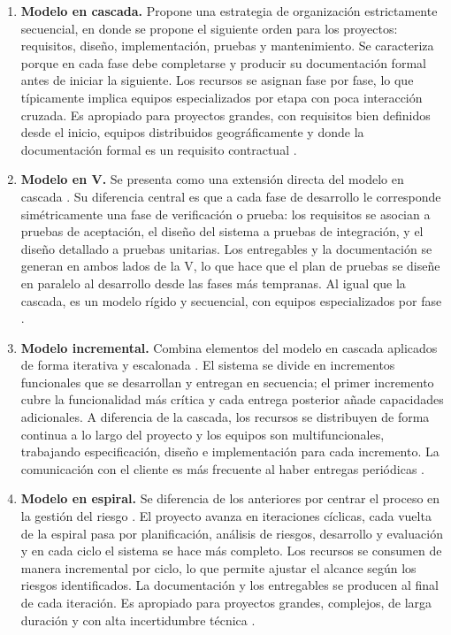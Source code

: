 \documentclass{article}
\begin{document}
\begin{enumerate}
    \item \textbf{Modelo en cascada.} Propone una estrategia de organización estrictamente secuencial, en donde se propone el siguiente orden para los proyectos: requisitos, diseño, implementación, pruebas y mantenimiento. Se caracteriza porque en cada fase debe completarse y producir su documentación formal antes de iniciar la siguiente. Los recursos se asignan fase por fase, lo que típicamente implica equipos especializados por etapa con poca interacción cruzada. Es apropiado para proyectos grandes, con requisitos bien definidos desde el inicio, equipos distribuidos geográficamente y donde la documentación formal es un requisito contractual \cite{pressman2015}.
    \item \textbf{Modelo en V.} Se presenta como una extensión directa del modelo en cascada \cite{pressman2015}. Su diferencia central es que a cada fase de desarrollo le corresponde simétricamente una fase de verificación o prueba: los requisitos se asocian a pruebas de aceptación, el diseño del sistema a pruebas de integración, y el diseño detallado a pruebas unitarias. Los entregables y la documentación se generan en ambos lados de la V, lo que hace que el plan de pruebas se diseñe en paralelo al desarrollo desde las fases más tempranas. Al igual que la cascada, es un modelo rígido y secuencial, con equipos especializados por fase \cite{academia2012}.
    \item \textbf{Modelo incremental.} Combina elementos del modelo en cascada aplicados de forma iterativa y escalonada \cite{pressman2015}. El sistema se divide en incrementos funcionales que se desarrollan y entregan en secuencia; el primer incremento cubre la funcionalidad más crítica y cada entrega posterior añade capacidades adicionales. A diferencia de la cascada, los recursos se distribuyen de forma continua a lo largo del proyecto y los equipos son multifuncionales, trabajando especificación, diseño e implementación para cada incremento. La comunicación con el cliente es más frecuente al haber entregas periódicas \cite{sommerville2016}.
    \item \textbf{Modelo en espiral.} Se diferencia de los anteriores por centrar el proceso en la gestión del riesgo \cite{pressman2015}. El proyecto avanza en iteraciones cíclicas, cada vuelta de la espiral pasa por planificación, análisis de riesgos, desarrollo y evaluación y en cada ciclo el sistema se hace más completo. Los recursos se consumen de manera incremental por ciclo, lo que permite ajustar el alcance según los riesgos identificados. La documentación y los entregables se producen al final de cada iteración. Es apropiado para proyectos grandes, complejos, de larga duración y con alta incertidumbre técnica \cite{sommerville2016}.

\end{enumerate}
\end{document}
